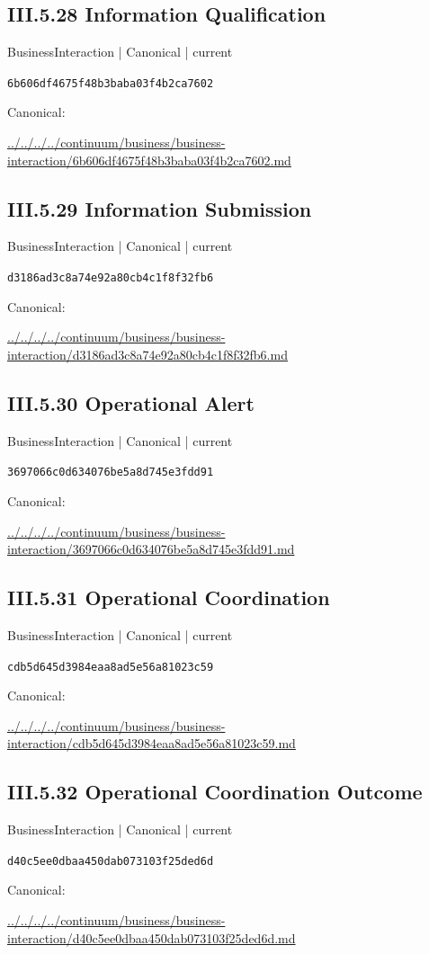 \documentclass[10pt,a4paper]{article}
\begin{document}
\subsection*{III.5.28 Information Qualification}
{\small BusinessInteraction | Canonical | current}\par
\texttt{6b606df4675f48b3baba03f4b2ca7602}\par
Canonical: \par
{\footnotesize\url{../../../../continuum/business/business-interaction/6b606df4675f48b3baba03f4b2ca7602.md}}\par
\subsection*{III.5.29 Information Submission}
{\small BusinessInteraction | Canonical | current}\par
\texttt{d3186ad3c8a74e92a80cb4c1f8f32fb6}\par
Canonical: \par
{\footnotesize\url{../../../../continuum/business/business-interaction/d3186ad3c8a74e92a80cb4c1f8f32fb6.md}}\par
\subsection*{III.5.30 Operational Alert}
{\small BusinessInteraction | Canonical | current}\par
\texttt{3697066c0d634076be5a8d745e3fdd91}\par
Canonical: \par
{\footnotesize\url{../../../../continuum/business/business-interaction/3697066c0d634076be5a8d745e3fdd91.md}}\par
\subsection*{III.5.31 Operational Coordination}
{\small BusinessInteraction | Canonical | current}\par
\texttt{cdb5d645d3984eaa8ad5e56a81023c59}\par
Canonical: \par
{\footnotesize\url{../../../../continuum/business/business-interaction/cdb5d645d3984eaa8ad5e56a81023c59.md}}\par
\subsection*{III.5.32 Operational Coordination Outcome}
{\small BusinessInteraction | Canonical | current}\par
\texttt{d40c5ee0dbaa450dab073103f25ded6d}\par
Canonical: \par
{\footnotesize\url{../../../../continuum/business/business-interaction/d40c5ee0dbaa450dab073103f25ded6d.md}}\par
\end{document}
